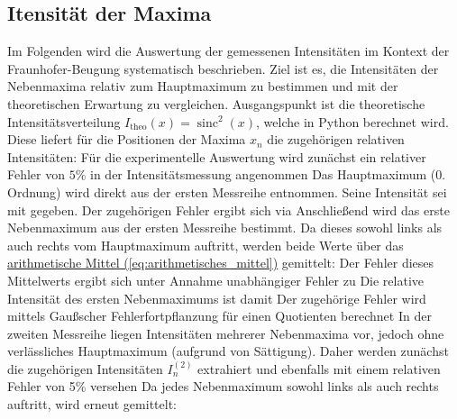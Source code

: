 \subsection{Itensität der Maxima}
Im Folgenden wird die Auswertung der gemessenen Intensitäten im Kontext der Fraunhofer-Beugung systematisch beschrieben. Ziel ist es, die Intensitäten der Nebenmaxima relativ zum Hauptmaximum zu bestimmen und mit der theoretischen Erwartung zu vergleichen.
Ausgangspunkt ist die theoretische Intensitätsverteilung $I_{\text{theo}}(x) = \operatorname{sinc}^2(x)$, welche in Python berechnet wird. Diese liefert für die Positionen der Maxima $x_n$ die zugehörigen relativen Intensitäten:
Für die experimentelle Auswertung wird zunächst ein relativer Fehler von $5\%$ in der Intensitätsmessung angenommen
Das Hauptmaximum (0. Ordnung) wird direkt aus der ersten Messreihe entnommen. Seine Intensität sei mit 
gegeben. Der zugehörigen Fehler ergibt sich via
Anschließend wird das erste Nebenmaximum aus der ersten Messreihe bestimmt. Da dieses sowohl links als auch rechts vom Hauptmaximum auftritt, werden beide Werte über das \hyperref[eq:arithmetisches_mittel]{arithmetische Mittel (\ref*{eq:arithmetisches_mittel})} gemittelt:
Der Fehler dieses Mittelwerts ergibt sich unter Annahme unabhängiger Fehler zu
Die relative Intensität des ersten Nebenmaximums ist damit
Der zugehörige Fehler wird mittels Gaußscher Fehlerfortpflanzung für einen Quotienten berechnet
In der zweiten Messreihe liegen Intensitäten mehrerer Nebenmaxima vor, jedoch ohne verlässliches Hauptmaximum (aufgrund von Sättigung). Daher werden zunächst die zugehörigen Intensitäten $I_n^{(2)}$ extrahiert und ebenfalls mit einem relativen Fehler von 5\% versehen
Da jedes Nebenmaximum sowohl links als auch rechts auftritt, wird erneut gemittelt:
